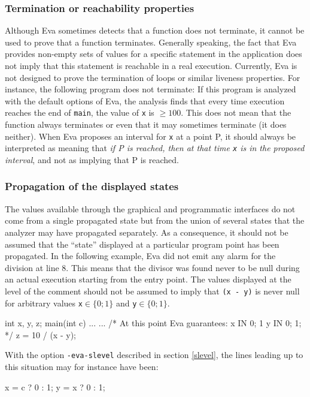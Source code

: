 \documentclass[web]{frama-c-book}
\newcommand{\Eva}{\textsf{Eva}}
\begin{document}
\subsubsection{Termination or reachability properties}
Although \Eva{} sometimes detects that
a function does not terminate, it cannot be used to prove that a
function terminates. Generally speaking, the fact that \Eva{}
provides non-empty sets of values for a specific statement in
the application does not imply that this statement is reachable in a
real execution. Currently, \Eva{} is not designed to prove
the termination of loops or similar liveness properties.
For instance,
the following program does not terminate:
If this program is analyzed
with the default options of \Eva{}, the analysis finds
that every time execution reaches the end of \lstinline|main|, the value
of \lstinline|x| is $\geq 100$. This does
not mean that the function always terminates or even that it may
sometimes terminate (it does neither). When \Eva{}
proposes an interval for \lstinline|x| at a point P, 
it should always be interpreted as meaning 
that {\em if P is reached, then at that time \lstinline|x| is in 
the proposed interval}, and
not as implying that P is reached.

\subsubsection{Propagation of the displayed states}
The values available through the graphical and programmatic interfaces
do not come from a single propagated state but from the union of 
several states that the analyzer may have propagated separately.
As a consequence, it should not be assumed that the ``state''
displayed at a particular program point has been propagated.
In the following example, \Eva{} did not emit any alarm
for the division at line 8. This means that the divisor was found never
to be null during an actual execution starting from the entry point.
The values displayed at the level of the comment should not be
assumed to imply that \lstinline|(x - y)| is never null
for arbitrary values \lstinline|x|$\in\{0;1\}$
and \lstinline|y|$\in\{0;1\}$.
\begin{listing}{1}
int x, y, z;
main(int c){
  ...
  ...
/* At this point Eva guarantees:
   x IN {0; 1} 
   y IN {0; 1}; */
  z = 10 / (x - y);
}
\end{listing}
\goodbreak

With the option \lstinline|-eva-slevel| described in section \ref{slevel}, 
the lines leading up to this situation may for instance have been:
\begin{listing}{3}
  x = c ? 0 : 1;
  y = x ? 0 : 1;
\end{listing}
\end{document}
